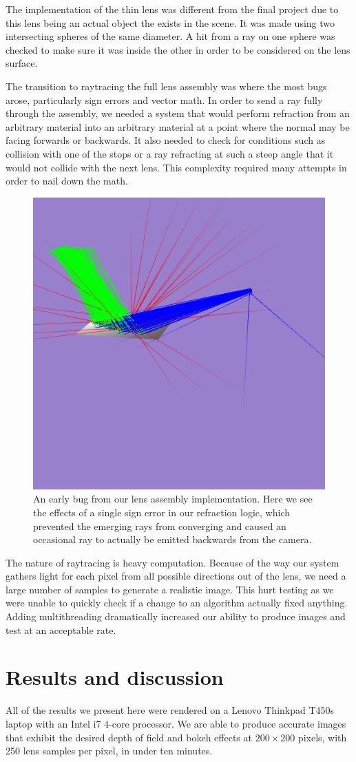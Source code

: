 \documentclass[twocolumn]{article}
\begin{document}
The implementation of the thin lens was different from the final project due to this
lens being an actual object the exists in the scene. It was made using two intersecting
spheres of the same diameter. A hit from a ray on one sphere was checked to make sure
it was inside the other in order to be considered on the lens surface.

The transition to raytracing the full lens assembly was where
the most bugs arose, particularly sign errors and vector math. In order to send a ray
fully through the assembly, we needed a system that would perform refraction from an
arbitrary material into an arbitrary material at a point where the normal may be facing
forwards or backwards. It also needed to check for conditions such as collision with
one of the stops or a ray refracting at such a steep angle that it would not collide
with the next lens. This complexity required many attempts in order to nail down the
math.

\begin{figure}
    \centering    
    \includegraphics[width=.4\textwidth]{img/backwards_rays.png}
    \caption{An early bug from our lens assembly implementation. Here we see the
    effects of a single sign error in our refraction logic, which prevented the
    emerging rays from converging and caused an occasional ray to actually be
    emitted backwards from the camera.}
    \label{fig:backwards_rays}
\end{figure}

The nature of raytracing is heavy computation. Because of the way our system
gathers light for each pixel from all possible directions out of the lens, we need
a large number of samples to generate a realistic image. This hurt testing as we were
unable to quickly check if a change to an algorithm actually fixed anything. Adding
multithreading dramatically increased our ability to produce images and test at an
acceptable rate.

\section{Results and discussion}
All of the results we present here were rendered on a Lenovo Thinkpad T450s laptop
with an Intel i7 4-core processor. We are able to produce accurate images that exhibit
the desired depth of field and bokeh effects at $200\times200$ pixels, with 250 lens
samples per pixel, in under ten minutes.
\end{document}
